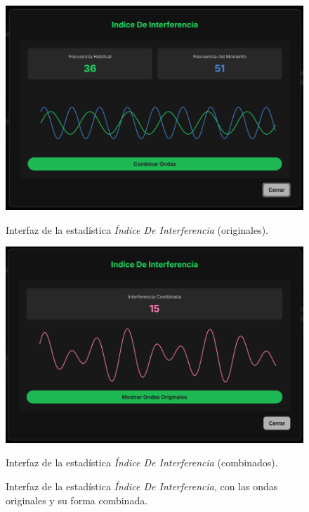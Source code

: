 \begin{figure}[H]
    \centering
    \vspace{-10pt}
    \begin{minipage}{0.47\textwidth}
        \centering
        \includegraphics[width=\textwidth]{figures/capturas_ui/indice_de_interferencia_originales.png}
        \caption{Interfaz de la estadística \textit{Índice De Interferencia} (originales).}
        \label{fig:indice_de_interferencia_originales}
    \end{minipage}
    \begin{minipage}{0.47\textwidth}
        \centering
        \includegraphics[width=\textwidth]{figures/capturas_ui/indice_de_interferencia_combinado.png}
        \caption{Interfaz de la estadística \textit{Índice De Interferencia} (combinados).}
        \label{fig:indice_de_interferencia_combinado}
    \end{minipage}
    \caption{Interfaz de la estadística \textit{Índice De Interferencia}, con las ondas originales y su forma combinada.}
    \label{fig:indice_de_interferencia}
\end{figure}

